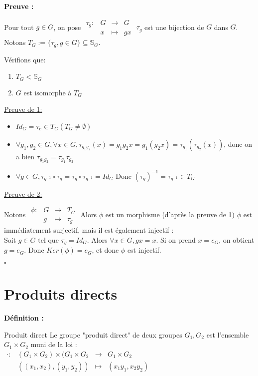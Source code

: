 \documentclass{report}
\renewenvironment{leftbar}{%
  \def\FrameCommand{\vrule width 0.4pt \hspace{10pt}}%
  \MakeFramed {\advance\hsize-\width \FrameRestore}}%
 {\endMakeFramed}%
\newenvironment{definition}[1][]{
    \begin{tcolorbox}[colframe= white]
    \textbf{Définition :} 
    #1 \par
    }
    {\end{tcolorbox}}
\newenvironment{preuve}{\vspace*{0.5cm}
    \begin{leftbar}
    \noindent\textbf{Preuve :}\par}{
    \begin{flushright}
    $\square$
    \end{flushright}
    \end{leftbar}
}
\newcommand{\fonction}[5]{
    \begin{array}{l|rcl}
    #1: & #2 & \longrightarrow & #3 \\
        & #4 & \longmapsto & #5 
    \end{array}
}
\begin{document}
\begin{preuve}
    Pour tout $g\in G$, on pose $\fonction{\tau_g}{G}{G}{x}{gx}$ $\tau_g$ est une bijection de $G$ dans $G$. Notons $T_G := \{\tau_g,g\in G\} \subseteq \mathbb{S}_G$. \par
    \noindent Vérifions que:  \par
    
    \begin{enumerate}
    \item $T_G < \mathbb{S}_G$
    \item $G$ est isomorphe à $T_G$
    \end{enumerate}

\noindent\underline{Preuve de 1:}
\begin{itemize}[label = $\bullet$]
\item $Id_G = \tau_e \in T_G (T_G \neq \emptyset)$
\item  $\forall g_1,g_2 \in G,\forall x \in G, \tau_{g_1 g_2}(x) = g_1 g_2 x = g_1(g_2 x) = \tau_{g_1}(\tau_{g_2}(x))$, donc on a bien $\tau_{g_1 g_2} = \tau_{g_1} \tau_{g_2}$
\item $\forall g \in G, \tau_{g^{-1}} \circ \tau_g = \tau_g \circ \tau_{g^{-1}} = Id_G$ Donc $(\tau_g)^{-1} = \tau_{g^{-1}} \in T_G$
\end{itemize}

\noindent\underline{Preuve de 2:}

    Notons $\fonction{\phi}{G}{T_G}{g}{\tau_g}$
    Alors $\phi$ est un morphisme (d'après la preuve de 1) $\phi$ est immédiatement surjectif, mais il est également injectif :\\
Soit $g\in G$ tel que $\tau_g = Id_G$. Alors $\forall x \in G, gx =  x$. Si on prend $x =  e_G$, on obtient $g = e_G$. Donc $Ker(\phi) = {e_G}$, et donc $\phi$ est injectif.
\end{preuve}

\section{Produits directs}

\begin{definition}{Produit direct}
    Le groupe "produit direct" de deux groupes $G_1, G_2$ est l'ensemble $G_1 \times G_2$ muni de la loi :\\
    $\fonction{\cdot}{(G_1 \times G_2)\times(G_1 \times G_2}{G_1 \times G_2}{((x_1 ,x_2),(y_1 ,y_2))}{(x_1 y_1 ,x_2 y_2)}$
\end{definition}
\end{document}
